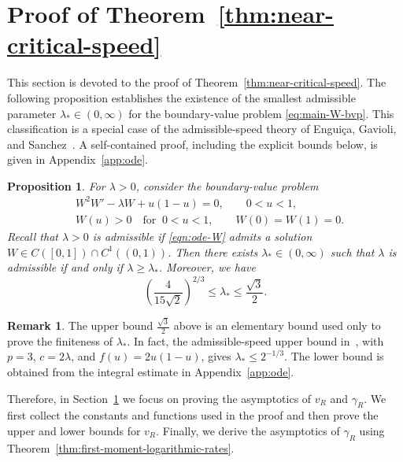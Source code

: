 \documentclass[12pt]{amsart}
\numberwithin{equation}{section}
\theoremstyle{plain}
\newtheorem{proposition}[theorem]{Proposition}
\theoremstyle{definition}
\newtheorem{remark}[theorem]{Remark}
\begin{document}
\section{Proof of Theorem~\ref{thm:near-critical-speed}}
\label{sec:two-sided-barriers}

This section is devoted to the proof of
Theorem~\ref{thm:near-critical-speed}. The following proposition establishes
the existence of the smallest admissible parameter
$\lambda_*\in(0,\infty)$ for the boundary-value problem
\eqref{eq:main-W-bvp}. This classification is a special case of the
admissible-speed theory of Engui\c{c}a, Gavioli, and
Sanchez~\cite{EnguicaGavioliSanchez2013}. A self-contained proof, including the
explicit bounds below, is given in Appendix~\ref{app:ode}.
\begin{proposition}
\label{prop:Cstar-halfline}
For $\lambda>0$, consider the boundary-value problem
\begin{equation}\label{eqn:ode-W}
\begin{aligned}
 &W^2W'-\lambda W+u(1-u)=0,\qquad 0<u<1,\\
 &W(u)>0\quad\text{for }\ 0<u<1, \qquad
 W(0)=W(1)=0.
\end{aligned}
\end{equation}
Recall that $\lambda>0$ is \emph{admissible} if \eqref{eqn:ode-W} admits a solution
$W\in C([0,1])\cap C^1((0,1))$.
Then there exists $\lambda_*\in(0,\infty)$ such that $\lambda$ is admissible
if and only if $\lambda\ge\lambda_*$. Moreover, we have
\begin{equation}\label{eq:Z-halfline}
    \left(\frac{4}{15\sqrt2}\right)^{2/3} \le \lambda_* \le \frac{\sqrt{3}}{2}.
\end{equation}
\end{proposition}
\begin{remark}
  The upper bound $\frac{\sqrt3}{2}$ above is an elementary bound used only to prove the finiteness of $\lambda_*$. In fact, the admissible-speed upper bound in~\cite{EnguicaGavioliSanchez2013},
with $p=3$, $c=2\lambda$, and $f(u)=2u(1-u)$, gives
$\lambda_*\le 2^{-1/3}$. The lower bound is obtained from the integral
estimate in Appendix~\ref{app:ode}.
\end{remark}
Therefore, in Section~\ref{sec:two-sided-barriers} we focus on proving the asymptotics of $v_R$ and $\gamma_R$.
We first collect the constants and
functions used in the proof and then prove the upper and lower bounds for $v_R$.
Finally, we derive the asymptotics of $\gamma_R$ using Theorem~\ref{thm:first-moment-logarithmic-rates}.
\end{document}
